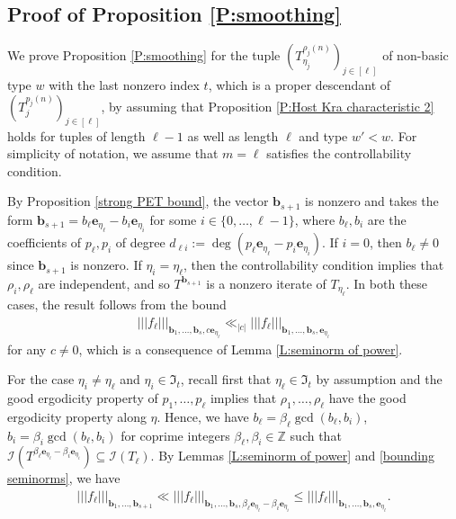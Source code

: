 \documentclass[11pt]{amsart}
\theoremstyle{definition}
\newcommand{\Z}{{\mathbb Z}}
\newcommand{\CI}{{\mathcal I}}
\newcommand{\FI}{{\mathfrak I}}
\newcommand{\be}{{\mathbf{e}}}
\renewcommand{\b}{{\textbf{b}}}
\newcommand{\nnorm}[1]{\lvert\!|\!| #1|\!|\!\rvert}
\newcommand{\brac}[1]{\mathopen{}\left( #1 \mathclose{}\right)}
\begin{document}
\subsection{Proof of Proposition \ref{P:smoothing}}

We prove Proposition \ref{P:smoothing} for the tuple $\brac{T_{\eta_{j}}^{\rho_{j}(n)}}_{j\in[\ell]}$ of non-basic type $w$ with the last nonzero index $t$, which is
a proper descendant of $\brac{T_j^{p_j(n)}}_{j\in[\ell]}$,  by assuming that Proposition \ref{P:Host Kra characteristic 2} holds for tuples of length $\ell-1$ as well as  length $\ell$ and type $w'<w$. For simplicity of notation, we assume that $m = \ell$ satisfies the controllability condition.

 By Proposition \ref{strong PET bound}, the vector $\b_{s+1}$ is nonzero and takes the form $\b_{s+1} = b_\ell \be_{\eta_\ell} - b_i \be_{\eta_i}$ for some $i\in\{0, \ldots, \ell-1\}$, where $b_\ell, b_i$ are the coefficients of $p_\ell, p_i$ of degree $d_{\ell i} := \deg(p_\ell \be_{\eta_\ell} - p_i\be_{\eta_i})$. If $i = 0$, then $b_\ell\neq 0$ since $\b_{s+1}$ is nonzero. If $\eta_i = \eta_\ell$, then the controllability condition implies that $\rho_i, \rho_\ell$ are independent, and so $T^{\b_{s+1}}$ is a nonzero iterate of $T_{\eta_\ell}$. In both these cases, the result follows from the bound
\begin{align*}
     \nnorm{f_\ell}_{{\b_1}, \ldots, {\b_{s}}, c \be_{\eta_\ell}}\ll_{|c|} \nnorm{f_\ell}_{{\b_1}, \ldots, {\b_{s}}, \be_{\eta_\ell}}
 \end{align*}
for any $c\neq 0$, which is a consequence of Lemma \ref{L:seminorm of power}.

For the case $\eta_i \neq \eta_\ell$ and $\eta_i\in \FI_t$, recall first that $\eta_\ell\in\FI_t$ by assumption and the good ergodicity property of $p_1, \ldots, p_\ell$ implies that $\rho_1, \ldots, \rho_\ell$ have the good ergodicity property along $\eta$. Hence, we have $b_\ell = \beta_\ell \gcd(b_\ell, b_i)$, $b_i = \beta_i \gcd(b_\ell, b_i)$ for coprime integers $\beta_\ell, \beta_i\in\Z$ such that $\CI(T^{\beta_\ell \be_{\eta_\ell} - \beta_i \be_{\eta_i}})\subseteq \CI(T_\ell)$. By Lemmas \ref{L:seminorm of power} and \ref{bounding seminorms}, we have
\begin{align*}
    \nnorm{f_\ell}_{{\b_1}, \ldots, {\b_{s+1}}}\ll \nnorm{f_\ell}_{\b_1, \ldots, \b_s, \beta_\ell \be_{\eta_\ell} - \beta_i \be_{\eta_i}}\leq \nnorm{f_\ell}_{{\b_1}, \ldots, {\b_{s}}, \be_{\eta_\ell}}.
\end{align*}
\end{document}
